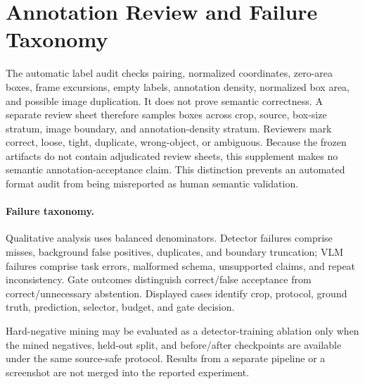 \section{Annotation Review and Failure Taxonomy}
\label{sec:audit}

The automatic label audit checks pairing, normalized coordinates, zero-area
boxes, frame excursions, empty labels, annotation density, normalized box
area, and possible image duplication.  It does not prove semantic correctness.
A separate review sheet therefore samples boxes across crop, source, box-size
stratum, image boundary, and annotation-density stratum.  Reviewers mark
correct, loose, tight, duplicate, wrong-object, or ambiguous.  Because the
frozen artifacts do not contain adjudicated review sheets, this supplement
makes no semantic annotation-acceptance claim.  This distinction prevents an
automated format audit from being misreported as human semantic validation.

\paragraph{Failure taxonomy.}
Qualitative analysis uses balanced denominators.  Detector failures comprise
misses, background false positives, duplicates, and boundary truncation; VLM
failures comprise task errors, malformed schema, unsupported claims, and repeat
inconsistency.  Gate outcomes distinguish correct/false acceptance from
correct/unnecessary abstention.  Displayed cases identify crop, protocol,
ground truth, prediction, selector, budget, and gate decision.

Hard-negative mining may be evaluated as a detector-training ablation only
when the mined negatives, held-out split, and before/after checkpoints are
available under the same source-safe protocol.  Results from a separate
pipeline or a screenshot are not merged into the reported experiment.
